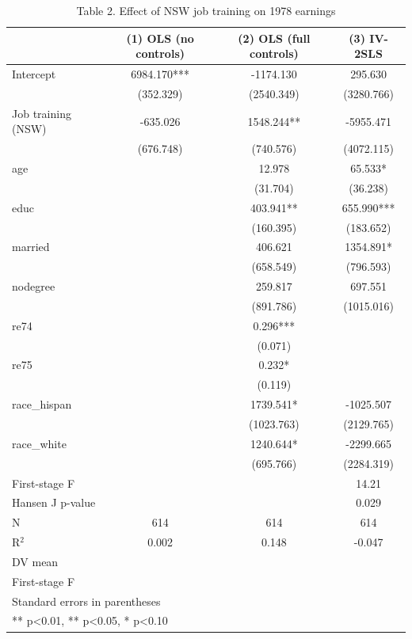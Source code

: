 \begin{table}[htbp]
\centering
\caption{Table 2. Effect of NSW job training on 1978 earnings}
\begin{tabular}{lccc}
\hline\hline
 & (1) OLS (no controls) & (2) OLS (full controls) & (3) IV-2SLS \\
\hline
Intercept & 6984.170*** & -1174.130 & 295.630 \\
 & (352.329) & (2540.349) & (3280.766) \\
Job training (NSW) & -635.026 & 1548.244** & -5955.471 \\
 & (676.748) & (740.576) & (4072.115) \\
age &  & 12.978 & 65.533* \\
 &  & (31.704) & (36.238) \\
educ &  & 403.941** & 655.990*** \\
 &  & (160.395) & (183.652) \\
married &  & 406.621 & 1354.891* \\
 &  & (658.549) & (796.593) \\
nodegree &  & 259.817 & 697.551 \\
 &  & (891.786) & (1015.016) \\
re74 &  & 0.296*** &  \\
 &  & (0.071) &  \\
re75 &  & 0.232* &  \\
 &  & (0.119) &  \\
race\_hispan &  & 1739.541* & -1025.507 \\
 &  & (1023.763) & (2129.765) \\
race\_white &  & 1240.644* & -2299.665 \\
 &  & (695.766) & (2284.319) \\
\hline
First-stage F &  &  & 14.21 \\
Hansen J p-value &  &  & 0.029 \\
\hline
N & 614 & 614 & 614 \\
R$^2$ & 0.002 & 0.148 & -0.047 \\
DV mean &  &  &  \\
First-stage F &  &  &  \\
\hline\hline
\multicolumn{4}{l}{\footnotesize Standard errors in parentheses} \\
\multicolumn{4}{l}{\footnotesize *** p<0.01, ** p<0.05, * p<0.10} \\
\end{tabular}
\end{table}